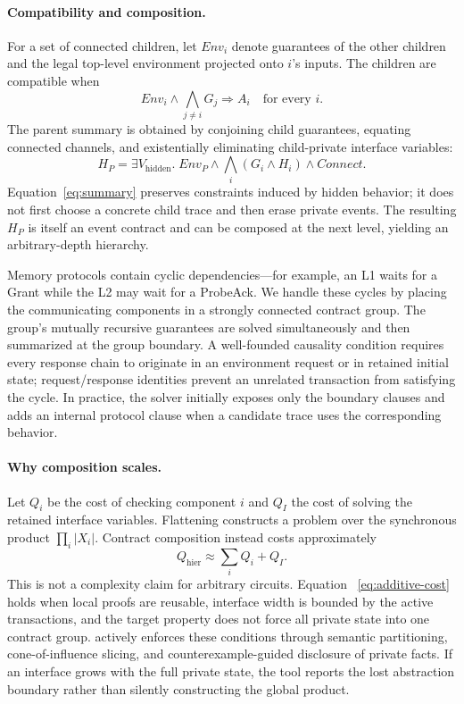 \paragraph{Compatibility and composition.}
For a set of connected children, let $Env_i$ denote guarantees of the other
children and the legal top-level environment projected onto $i$'s inputs.
The children are compatible when
\begin{equation}
  Env_i \land \bigwedge_{j\neq i}G_j \Rightarrow A_i
  \quad\text{for every }i.
  \label{eq:compatibility}
\end{equation}
The parent summary is obtained by conjoining child guarantees, equating
connected channels, and existentially eliminating child-private interface
variables:
\begin{equation}
 H_P = \exists V_{\mathrm{hidden}}.\;
       Env_P \land \bigwedge_i(G_i\land H_i) \land Connect.
 \label{eq:summary}
\end{equation}
Equation~\ref{eq:summary} preserves constraints induced by hidden behavior; it
does not first choose a concrete child trace and then erase private events.
The resulting $H_P$ is itself an event contract and can be composed at the next
level, yielding an arbitrary-depth hierarchy.

Memory protocols contain cyclic dependencies---for example, an L1 waits for a
Grant while the L2 may wait for a ProbeAck.  We handle these cycles by placing
the communicating components in a strongly connected contract group.  The
group's mutually recursive guarantees are solved simultaneously and then
summarized at the group boundary.  A well-founded causality condition requires
every response chain to originate in an environment request or in retained
initial state; request/response identities prevent an unrelated transaction
from satisfying the cycle.  In practice, the solver initially exposes only
the boundary clauses and adds an internal protocol clause when a candidate
trace uses the corresponding behavior.

\paragraph{Why composition scales.}
Let $Q_i$ be the cost of checking component $i$ and $Q_I$ the cost of solving
the retained interface variables.  Flattening constructs a problem over the
synchronous product $\prod_i|X_i|$.  Contract composition instead costs
approximately
\begin{equation}
  Q_{\mathrm{hier}} \approx \sum_i Q_i + Q_I.
  \label{eq:additive-cost}
\end{equation}
This is not a complexity claim for arbitrary circuits.  Equation
~\ref{eq:additive-cost} holds when local proofs are reusable, interface width
is bounded by the active transactions, and the target property does not force
all private state into one contract group.  \sys{} actively enforces these
conditions through semantic partitioning, cone-of-influence slicing, and
counterexample-guided disclosure of private facts.  If an interface grows with
the full private state, the tool reports the lost abstraction boundary rather
than silently constructing the global product.

